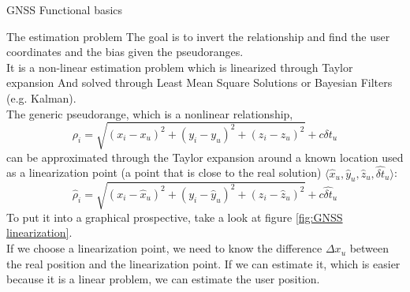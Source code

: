 \begin{section}{GNSS Functional basics}
\begin{subsection}{The estimation problem}
      The goal is to invert the relationship and find the user coordinates and the bias given the
      pseudoranges.\\
      It is a non-linear estimation problem which is linearized through Taylor expansion 
      And solved through Least Mean Square Solutions or Bayesian Filters (e.g. Kalman).\\

      The generic pseudorange, which is a nonlinear relationship,
      \begin{equation*}
        \rho_i = \sqrt{(x_i - x_u)^2 + (y_i - y_u)^2 + (z_i - z_u)^2} + c\delta t_u
      \end{equation*}
      can be approximated through the Taylor expansion around a known location used as a linearization point
      (a point that is close to the real solution) $\langle \hat{x}_u, \hat{y}_u, \hat{z}_u, \hat{\delta t}_u \rangle$:
      \begin{equation*}
        \hat{\rho}_i = \sqrt{(x_i - \hat{x}_u)^2 + (y_i - \hat{y}_u)^2 + (z_i - \hat{z}_u)^2} + c\hat{\delta t}_u
        \label{eq:GNSS linearization}
      \end{equation*}
      To put it into a graphical prospective, take a look at figure \ref{fig:GNSS linearization}.\\
      If we choose a linearization point, we need to know the difference $\Delta x_u$ between the real
      position and the linearization point. If we can estimate it, which is easier because it is a 
      linear problem, we can estimate the user position.\\



\end{subsection}
\end{section}
